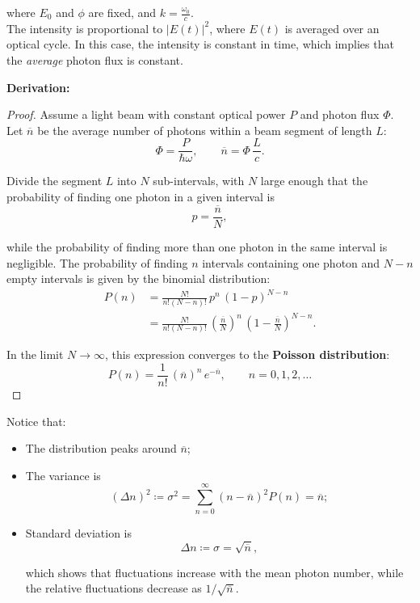 where $E_0$ and $\phi$ are fixed, and $k = \frac{\omega_0}{c}$.\\
The intensity is proportional to $|E(t)|^2$, where $E(t)$ is averaged over an optical cycle. In this case, the intensity is constant in time, which implies that the \textit{average} photon flux is constant.


\textbf{Derivation:}
\begin{proof}
Assume a light beam with constant optical power $P$ and photon flux $\Phi$. Let $\overline{n}$ be the average number of photons within a beam segment of length $L$:
\[
\Phi = \frac{P}{\hbar \omega}, \qquad \overline{n} = \Phi \, \frac{L}{c}.
\]

Divide the segment $L$ into $N$ sub-intervals, with $N$ large enough that the probability of finding one photon in a given interval is
\[
p = \frac{\overline{n}}{N},
\]

while the probability of finding more than one photon in the same interval is negligible. The probability of finding $n$ intervals containing one photon and $N-n$ empty intervals is given by the binomial distribution:
\[
\begin{split}
P(n) &= \frac{N!}{n!(N-n)!}\, p^n\, (1-p)^{N-n} \\
&= \frac{N!}{n!(N-n)!}\, \left(\frac{\overline{n}}{N}\right)^n \, \left(1-\frac{\overline{n}}{N}\right)^{N-n}.
\end{split}
\]

In the limit $N \to \infty$, this expression converges to the \textbf{Poisson distribution}:
\begin{equation}\label{eqn:7-poisson-distribution}
P(n) = \frac{1}{n!}\, (\overline{n})^n\, e^{-\overline{n}}, \qquad n=0,1,2,\dots
\end{equation}

\end{proof}

Notice that:
\begin{itemize}
    \item The distribution peaks around $\overline{n}$;
    
    \item The variance is
    \[
    (\Delta n)^2 \coloneqq \sigma^2 = \sum_{n=0}^{\infty} (n-\overline{n})^2 P(n) = \overline{n};
    \]
    
    \item Standard deviation is
    \[
    \Delta n \coloneqq \sigma = \sqrt{\overline{n}},
    \]

    which shows that fluctuations increase with the mean photon number, while the relative fluctuations decrease as $1/\sqrt{\overline{n}}$.
\end{itemize}
